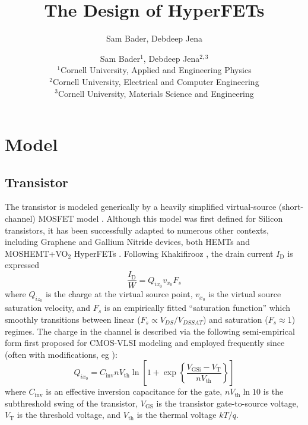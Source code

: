 \documentclass[letterpaper]{article}
\newcommand{\VT}{\ensuremath{V_\mathrm{T}}}
\newcommand{\Vth}{\ensuremath{V_\mathrm{th}}}
\newcommand{\VGS}{\ensuremath{V_\mathrm{GS}}}
\newcommand{\VGSi}{\ensuremath{V_\mathrm{GSi}}}
\newcommand{\ID}{\ensuremath{I_\mathrm{D}}}
\begin{document}
\title{The Design of HyperFETs}
\author{Sam Bader, Debdeep Jena}
\author{Sam Bader$^1$, Debdeep Jena$^{2,3}$\\ $^1$Cornell University, Applied and Engineering Physics\\$^2$Cornell University, Electrical and Computer Engineering\\$^3$Cornell University, Materials Science and Engineering }


\maketitle


\section{Model}
\subsection{Transistor}
The transistor is modeled generically by a heavily simplified virtual-source (short-channel) MOSFET model \cite{Khakifirooz_2009}.  Although this model was first defined for Silicon transistors, it has been successfully adapted to numerous other contexts, including Graphene \cite{Han_Wang_2011} and Gallium Nitride devices, both HEMTs \cite{RadhakrishnaThesis} and MOSHEMT+VO$_2$ HyperFETs \cite{Verma_2017}.  Following Khakifirooz \cite{Khakifirooz_2009}, the drain current $\ID$ is expressed
\begin{equation}
\frac{\ID}{W}=Q_{ix_0}v_{x_0}F_s
\end{equation}
where $Q_{iz_0}$ is the charge at the virtual source point, $v_{x_0}$ is the virtual source saturation velocity, and $F_s$ is an empirically fitted ``saturation function'' which smoothly transitions between linear ($F_s\propto V_{DS}/V_{DSSAT}$) and saturation ($F_s\approx 1$) regimes.  The charge in the channel is described via the following semi-empirical form first proposed for CMOS-VLSI modeling \cite{Wright_1985} and employed frequently since (often with modifications, eg \cite{Khakifirooz_2009, RadhakrishnaThesis}):
\begin{equation}
Q_{ix_0}=C_\mathrm{inv}nV_\mathrm{th}\ln\left[1+\exp\left\{\frac{\VGSi-\VT}{nV_\mathrm{th}}\right\}\right]
\end{equation}
where $C_\mathrm{inv}$ is an effective inversion capacitance for the gate, $n\Vth \ln10$ is the subthreshold swing of the transistor, $\VGS$ is the transistor gate-to-source voltage, $\VT$ is the threshold voltage, and $V_\mathrm{th}$ is the thermal voltage $kT/q$.
\end{document}
